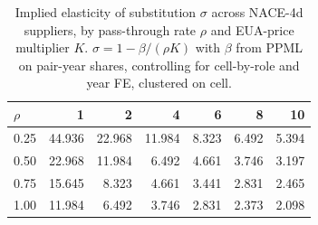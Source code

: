\begin{table}[ht]
\centering
\caption{Implied elasticity of substitution $\sigma$ across NACE-4d suppliers, by pass-through rate $\rho$ and EUA-price multiplier $K$. $\sigma = 1 - \beta / (\rho K)$ with $\beta$ from PPML on pair-year shares, controlling for cell-by-role and year FE, clustered on cell.} 
\label{tab:phase4_within_intensive_ces_ppml_sigma_grid}
\begin{tabular}{lrrrrrr}
  \toprule
$\rho$ & 1 & 2 & 4 & 6 & 8 & 10 \\ 
  \midrule
0.25 & 44.936 & 22.968 & 11.984 & 8.323 & 6.492 & 5.394 \\ 
  0.50 & 22.968 & 11.984 & 6.492 & 4.661 & 3.746 & 3.197 \\ 
  0.75 & 15.645 & 8.323 & 4.661 & 3.441 & 2.831 & 2.465 \\ 
  1.00 & 11.984 & 6.492 & 3.746 & 2.831 & 2.373 & 2.098 \\ 
   \bottomrule
\end{tabular}
\end{table}
